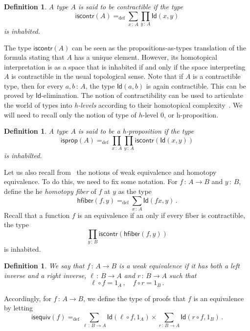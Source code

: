 \documentclass[10pt,a4paper,oneside,reqno]{amsart}
\theoremstyle{mythm}
\theoremstyle{mydef}
\newtheorem{definition}[theorem]{Definition}
\theoremstyle{myrmk}
\newcommand{\ie}{\text{i.e.\ }}
\newcommand{\defeq}{=_{\mathrm{def}}}
\newcommand{\co}{\,{:}\,}
\newcommand{\hfiber}{\mathsf{hfiber}}
\newcommand{\iscontr}{\mathsf{iscontr}}
\newcommand{\isprop}{\mathsf{isprop}}
\newcommand{\isequiv}{\mathsf{isequiv}}
\newcommand{\Id}{\mathsf{Id}}
\begin{document}
\begin{definition}  A type $A$ is said to be \emph{contractible} if the  type 
 \begin{equation}
 \label{eq:contractible}
\iscontr(A) \defeq \sum_{x\co A} \prod_{y\co A}\Id(x,y)
\end{equation}
is inhabited.
\end{definition} 

The type $\iscontr(A)$ can be seen as the propositions-as-types translation
of the formula stating that $A$ has a unique element. However, its homotopical interpretation 
is as a space that is inhabited if and only if the space interpreting $A$ is contractible in the usual
topological sense. Note that if $A$ is a contractible type, then for every $a, b \co A$, the type $\Id(a,b)$ is again contractible. 
This can be proved  by $\Id$-elimination. The notion of contractibility can be used to articulate the world of types  into \emph{h-levels} according to their
homotopical complexity~\cite{VoevodskyV:unifc}. We will need to recall only the notion of type of $h$-level 0, or h-proposition.

\begin{definition} A type $A$ is said to be a \emph{h-proposition} if the type
\[
\isprop(A) \defeq \prod_{x \co A} \prod_{y \co A} \iscontr( \Id(x,y)) 
\]
is inhabilted.
\end{definition}


Let us also recall from~\cite{VoevodskyV:unifc} the notions of weak equivalence and homotopy equivalence. To do this, we need to fix some notation. For $f \co A \rightarrow B$ and $y \co B$, define the he \emph{homotopy fiber} of $f$ at $y$ as the type
\[
 \hfiber(f,y) \defeq \sum_{x \co A} \Id(f x, y) \, .
\]
Recall that a function $f$ is an equivalence if an only if every fiber is contractible, \ie the type
\[
 \prod_{y \co B}   \iscontr(\hfiber(f,y)) 
\]
is inhabited. 


\begin{definition} \label{thm:weq}  We say that $f \co A \rightarrow B$ is a weak equivalence if it has both a left inverse and a right inverse, \ie
$\ell \co B \to A$ and $r \co B \to A$ such that 
\[
 \ell \circ f = 1_A \, ,  \quad  f \circ r = 1_B  \, .
 \]
 \end{definition}
 
 Accordingly, for $f \co A \rightarrow B$, we define the type of proofs that $f$ is an equivalence by letting
 \[ 
 \isequiv(f) \defeq \sum_{\ell \co B \to A} \Id( \ell \circ f, 1_A) \times \sum_{r \co B \to A} \Id( r \circ f , 1_B) \, .
 \]
\end{document}
